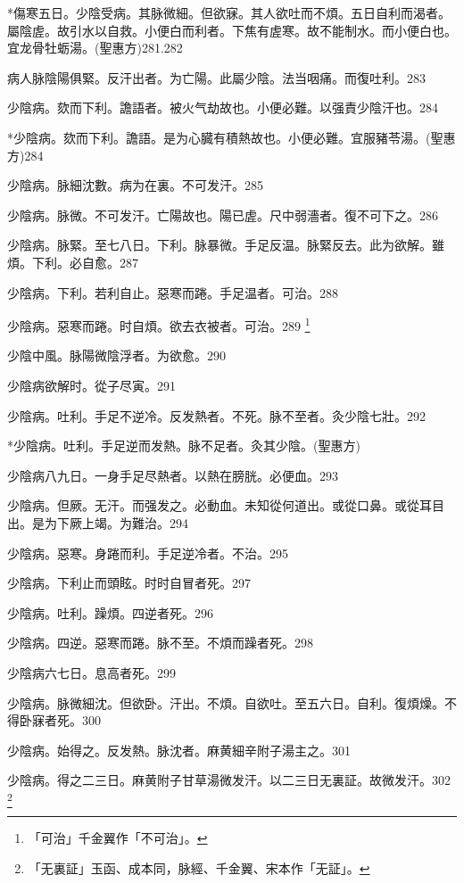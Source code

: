 \documentclass[b5paper,twoside,zihao=-4,UTF8]{ctexbook}
\begin{document}
*傷寒五日。少陰受病。其脉微細。但欲寐。其人欲吐而不煩。五日自利而渴者。屬陰虗。故引水以自救。小便白而利者。下焦有虗寒。故不能制水。而小便白也。宜龙骨牡蛎湯。(聖惠方)281.282

病人脉陰陽俱緊。反汗出者。为亡陽。此屬少陰。法当咽痛。而復吐利。283

少陰病。欬而下利。譫語者。被火气劫故也。小便必難。以强責少陰汗也。284

*少陰病。欬而下利。譫語。是为心臓有積熱故也。小便必難。宜服豬苓湯。(聖惠方)284

少陰病。脉細沈數。病为在裏。不可发汗。285

少陰病。脉微。不可发汗。亡陽故也。陽已虗。尺中弱濇者。復不可下之。286

少陰病。脉緊。至七八日。下利。脉暴微。手足反温。脉緊反去。此为欲解。雖煩。下利。必自愈。287

少陰病。下利。若利自止。惡寒而踡。手足温者。可治。288

少陰病。惡寒而踡。时自煩。欲去衣被者。可治。289
	\footnote{「可治」千金翼作「不可治」。}

少陰中風。脉陽微陰浮者。为欲愈。290

少陰病欲解时。從子尽寅。291

少陰病。吐利。手足不逆{冷}。反发熱者。不死。脉不至者。灸少陰七壯。292

*少陰病。吐利。手足逆而发熱。脉不足者。灸其少陰。(聖惠方)

少陰病八九日。一身手足尽熱者。以熱在膀胱。必便血。293

少陰病。但厥。无汗。而强发之。必動血。未知從何道出。或從口鼻。或從{耳}目出。是为下厥上竭。为難治。294

少陰病。惡寒。身踡而利。手足逆{冷}者。不治。295

少陰病。下利止而頭眩。时时自冒者死。297

少陰病。吐利。躁煩。四逆者死。296

少陰病。四逆。惡寒而踡。脉不至。不煩而躁者死。298

少陰病六七日。息高者死。299

少陰病。脉微細沈。但欲卧。汗出。不煩。自欲吐。{至}五六日。自利。復煩燥。不得卧寐者死。300

少陰病。始得之。反发熱。脉沈者。麻黄細辛附子湯主之。301

少陰病。得之二三日。麻黄附子甘草湯微发汗。以二三日无{裏}証。故微发汗。302
	\footnote{「无裏証」玉函、成本同，脉經、千金翼、宋本作「无証」。}
\end{document}
